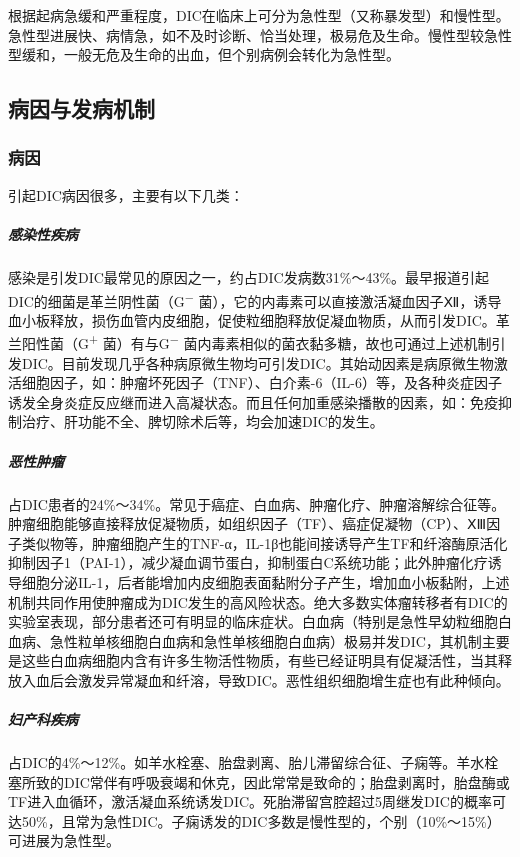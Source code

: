 根据起病急缓和严重程度，DIC在临床上可分为急性型（又称暴发型）和慢性型。急性型进展快、病情急，如不及时诊断、恰当处理，极易危及生命。慢性型较急性型缓和，一般无危及生命的出血，但个别病例会转化为急性型。

\subsection{病因与发病机制}

\subsubsection{病因}

引起DIC病因很多，主要有以下几类：

\subparagraph{感染性疾病}

感染是引发DIC最常见的原因之一，约占DIC发病数31\%～43\%。最早报道引起DIC的细菌是革兰阴性菌（G\textsuperscript{−}
菌），它的内毒素可以直接激活凝血因子Ⅻ，诱导血小板释放，损伤血管内皮细胞，促使粒细胞释放促凝血物质，从而引发DIC。革兰阳性菌（G\textsuperscript{+}
菌）有与G\textsuperscript{−}
菌内毒素相似的菌衣黏多糖，故也可通过上述机制引发DIC。目前发现几乎各种病原微生物均可引发DIC。其始动因素是病原微生物激活细胞因子，如：肿瘤坏死因子（TNF）、白介素-6（IL-6）等，及各种炎症因子诱发全身炎症反应继而进入高凝状态。而且任何加重感染播散的因素，如：免疫抑制治疗、肝功能不全、脾切除术后等，均会加速DIC的发生。

\subparagraph{恶性肿瘤}

占DIC患者的24\%～34\%。常见于癌症、白血病、肿瘤化疗、肿瘤溶解综合征等。肿瘤细胞能够直接释放促凝物质，如组织因子（TF）、癌症促凝物（CP）、ⅩⅢ因子类似物等，肿瘤细胞产生的TNF-α，IL-1β也能间接诱导产生TF和纤溶酶原活化抑制因子1（PAI-1），减少凝血调节蛋白，抑制蛋白C系统功能；此外肿瘤化疗诱导细胞分泌IL-1，后者能增加内皮细胞表面黏附分子产生，增加血小板黏附，上述机制共同作用使肿瘤成为DIC发生的高风险状态。绝大多数实体瘤转移者有DIC的实验室表现，部分患者还可有明显的临床症状。白血病（特别是急性早幼粒细胞白血病、急性粒单核细胞白血病和急性单核细胞白血病）极易并发DIC，其机制主要是这些白血病细胞内含有许多生物活性物质，有些已经证明具有促凝活性，当其释放入血后会激发异常凝血和纤溶，导致DIC。恶性组织细胞增生症也有此种倾向。

\subparagraph{妇产科疾病}

占DIC的4\%～12\%。如羊水栓塞、胎盘剥离、胎儿滞留综合征、子痫等。羊水栓塞所致的DIC常伴有呼吸衰竭和休克，因此常常是致命的；胎盘剥离时，胎盘酶或TF进入血循环，激活凝血系统诱发DIC。死胎滞留宫腔超过5周继发DIC的概率可达50\%，且常为急性DIC。子痫诱发的DIC多数是慢性型的，个别（10\%～15\%）可进展为急性型。

